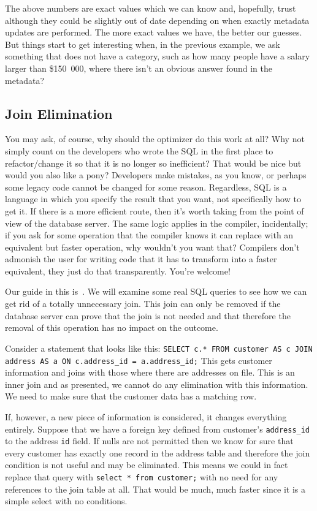 \documentclass[a4paper]{report}
\begin{document}
The above numbers are exact values which we can know and, hopefully, trust although they could be slightly out of date depending on when exactly metadata updates are performed. The more exact values we have, the better our guesses. But things start to get interesting when, in the previous example, we ask something that does not have a category, such as how many people have a salary larger than \$150~000, where there isn't an obvious answer found in the metadata?

\subsection*{Join Elimination}

You may ask, of course, why should the optimizer do this work at all? Why not simply count on the developers who wrote the SQL in the first place to refactor/change it so that it is no longer so inefficient? That would be nice but would you also like a pony?  Developers make mistakes, as you know, or perhaps some legacy code cannot be changed for some reason. Regardless, SQL is a language in which you specify the result that you want, not specifically how to get it. If there is a more efficient route, then it's worth taking from the point of view of the database server. The same logic applies in the compiler, incidentally; if you ask for some operation that the compiler knows it can replace with an equivalent but faster operation, why wouldn't you want that? Compilers don't admonish the user for writing code that it has to transform into a faster equivalent, they just do that transparently. You're welcome!

Our guide in this is~\cite{joinelim}. We will examine some real SQL queries to see how we can get rid of a totally unnecessary join. This join can only be removed if the database server can prove that the join is not needed and that therefore the removal of this operation has no impact on the outcome.


Consider a statement that looks like this: \texttt{SELECT c.* FROM customer AS c JOIN address AS a ON c.address\_id = a.address\_id;} This gets customer information and joins with those where there are addresses on file. This is an inner join and as presented, we cannot do any elimination with this information. We need to make sure that the customer data has a matching row.

If, however, a new piece of information is considered, it changes everything entirely. Suppose that we have a foreign key defined from customer's \texttt{address\_id} to the address \texttt{id} field. If nulls are not permitted then we know for sure that every customer has exactly one record in the address table and therefore the join condition is not useful and may be eliminated. This means we could in fact replace that query with \texttt{select * from customer;} with no need for any references to the join table at all. That would be much, much faster since it is a simple select with no conditions.
\end{document}
